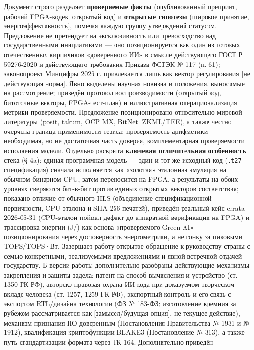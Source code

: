 \documentclass[
  russian,
]{article}
\begin{document}
Документ строго разделяет \textbf{проверяемые факты} (опубликованный
препринт, рабочий FPGA-кодек, открытый код) и \textbf{открытые гипотезы}
(широкое принятие, энергоэффективность), помечая каждую группу
утверждений статусом. Предложение не претендует на эксклюзивность или
превосходство над государственными инициативами --- оно позиционируется
как один из готовых отечественных кирпичиков «доверенного ИИ» в смысле
действующего ГОСТ Р 59276-2020 и действующего требования Приказа ФСТЭК №
117 (п. 61); законопроект Минцифры 2026 г. привлекается лишь как вектор
регулирования {[}не действующая норма{]}. Явно выделены научная новизна
и положения, выносимые на рассмотрение; приведён протокол
воспроизводимости (открытый код, битоточные векторы, FPGA-тест-план) и
иллюстративная операционализация метрики проверяемости. Предложение
позиционировано относительно мировой литературы (posit, takum, OCP MX,
BitNet, ZKML/TEE), а также честно очерчена граница применимости тезиса:
проверяемость арифметики --- необходимая, но не достаточная часть
доверия, комплементарная проверяемости исполнения модели. Отдельно
раскрыта \textbf{ключевая отличительная особенность} стека (§ 4a):
единая программная модель --- один и тот же исходный код
(\texttt{.t27}-спецификация) сначала исполняется как «золотая» эталонная
эмуляция на обычном бинарном CPU, затем переносится на FPGA, а
результаты на обоих уровнях сверяются бит-в-бит против
единых открытых векторов соответствия; показано отличие от обычного HLS
(объединение спецификационной первичности, CPU-эталона и
SHA-256-печатей), приведён реальный кейс errata 2026-05-31 (CPU-эталон
поймал дефект до аппаратной верификации на FPGA) и трассировка
энергии (J/) как основа «проверяемого Green AI» ---
позиционирования через достоверность энергометрики, а не гонку за
пиковыми TOPS/TOPS·Вт. Завершает работу открытое обращение к руководству
страны с семью конкретными, реализуемыми предложениями и явной встречной
отдачей государству. В версии работы дополнительно разобраны действующие
механизмы закрепления и защиты задела: патент на способ вычисления и
устройство (ст. 1350 ГК РФ), авторско-правовая охрана ИИ-кода при
доказуемом творческом вкладе человека (ст. 1257, 1259 ГК РФ), экспортный
контроль и его связь с экспортом RTL/дизайна технологии (ФЗ № 183-ФЗ; изготовление кремния за рубежом рассматривается как [замысел/будущая опция], не текущее действие),
механизм признания ПО доверенным (Постановления Правительства № 1931 и №
1912), квалификация криптофункции BLAKE3 (Постановление № 313), а также
путь стандартизации формата через ТК 164. Дополнительно приведён
\end{document}
